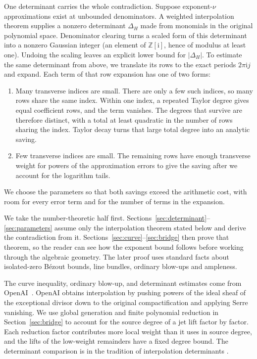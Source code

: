 \documentclass[11pt]{article}
\theoremstyle{definition}
\theoremstyle{remark}
\newcommand{\Z}{\mathbb Z}
\newcommand{\ii}{\mathrm i}
\numberwithin{equation}{section}
\begin{document}
One determinant carries the whole contradiction. Suppose exponent-\(\nu\) approximations exist
at unbounded denominators. A weighted interpolation theorem supplies a
nonzero determinant \(\Delta_H\) made from monomials in the original
polynomial space. Denominator clearing turns a scaled form of this
determinant into a nonzero Gaussian integer (an element of
\(\Z[\ii]\), hence of modulus at least one). Undoing the scaling leaves
an explicit lower bound for \(|\Delta_H|\). To estimate the same
determinant from above, we translate its rows to the exact periods
\(2\pi\ii j\) and expand. Each term of that row expansion has one of two
forms:
\begin{enumerate}
\item Many transverse indices are small. There are only a few such
indices, so many rows share the same index. Within one index, a repeated
Taylor degree gives equal coefficient rows, and the term vanishes. The
degrees that survive are therefore distinct, with a total at least
quadratic in the number of rows sharing the index. Taylor decay turns
that large total degree into an analytic saving.
\item Few transverse indices are small. The remaining rows have enough
transverse weight for powers of the approximation errors to give the
saving after we account for the logarithm tails.
\end{enumerate}
We choose the parameters so that both savings exceed the arithmetic
cost, with room for every error term and for the number of terms in the
expansion.

We take the number-theoretic half first.
Sections~\ref{sec:determinant}--\ref{sec:parameters} assume only the
interpolation theorem stated below and derive the contradiction from it.
Sections~\ref{sec:curve}--\ref{sec:bridge} then prove that theorem, so
the reader can see how the exponent bound follows before working through
the algebraic geometry. The later proof uses standard facts about
isolated-zero B\'ezout bounds, line bundles, ordinary blow-ups and
ampleness.

The curve inequality, ordinary blow-up, and determinant estimates come
from OpenAI~\cite{openai}. OpenAI obtains interpolation by pushing
powers of the ideal sheaf of the exceptional divisor down to the
original compactification and applying Serre vanishing. We use global
generation and finite polynomial reduction in Section~\ref{sec:bridge}
to account for the source degree of a jet lift factor by factor. Each
reduction factor contributes more local weight than it uses in source
degree, and the lifts of the low-weight remainders have a fixed degree
bound. The determinant comparison is in the tradition of interpolation
determinants \cite{laurent1991,laurent2000}.
\end{document}

